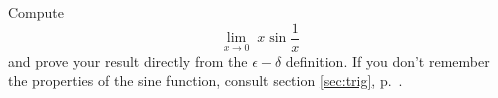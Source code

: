 Compute
\begin{equation*}
  \lim_{x\rightarrow0} \; x\sin\frac{1}{x}
\end{equation*}
and prove your result directly from the $\epsilon-\delta$ definition.
If you don't remember the properties of the sine function, consult
section \ref{sec:trig}, p.~\pageref{sec:trig}.
